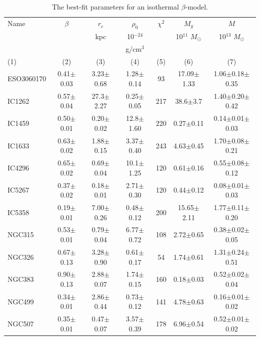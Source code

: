 \documentclass[iop]{emulateapj}
\begin{document}
\setcounter{table}{2}
\begin{table}
\centering
\caption{The best-fit parameters for an isothermal $\beta$-model.}\label{tab3}
\begin{tabular}{lcccccc}
\hline
Name   & $\beta$       & $r_c$         & $\rho_0$   & $\chi^2$ &  $M_{g}$              & $M$                   \\
       &               & kpc           & 10$^{-24}$ &          &  10$^{11}$ $M_{\odot}$ & 10$^{13}$ $M_{\odot}$ \\
       &               &               & g/cm$^3$   &          &                       &                       \\
  (1)  &         (2)   &  (3)          &  (4)       & (5)      &   (6)                 & (7)                   \\ 
\hline
ESO3060170 & 0.41$\pm$0.03 & 3.23$\pm$0.68 & 1.28$\pm$0.14  & 93  & 17.09$\pm$1.33 & 1.06$\pm$0.18$\pm$0.35 \\
IC1262  & 0.57$\pm$0.04 & 27.3$\pm$2.27 & 0.25$\pm$0.05 & 217 & 38.6$\pm$3.7 & 1.40$\pm$0.20$\pm$0.42 \\
IC1459  & 0.50$\pm$0.01 & 0.20$\pm$0.02 & 12.8$\pm$1.60 & 220 & 0.27$\pm$0.11 & 0.14$\pm$0.01$\pm$0.03    \\
IC1633  & 0.63$\pm$0.02 & 1.88$\pm$0.15 & 3.37$\pm$0.40 & 243 & 4.63$\pm$0.45 & 1.70$\pm$0.08$\pm$0.21   \\
IC4296  & 0.65$\pm$0.02 & 0.69$\pm$0.04 & 10.1$\pm$1.25 & 120 & 0.61$\pm$0.16 & 0.55$\pm$0.08$\pm$0.12     \\
IC5267  & 0.37$\pm$0.02 & 0.18$\pm$0.01 & 2.71$\pm$0.30 & 120 & 0.44$\pm$0.12 & 0.08$\pm$0.01$\pm$0.03   \\
IC5358  & 0.19$\pm$0.01 & 7.00$\pm$0.26 & 0.48$\pm$0.12 & 200 & 15.65$\pm$2.11 & 1.77$\pm$0.11$\pm$0.20  \\
NGC315  & 0.53$\pm$0.01 & 0.79$\pm$0.04 & 6.77$\pm$0.72 & 108 & 2.72$\pm$0.65 & 0.38$\pm$0.02$\pm$0.05   \\
NGC326  & 0.67$\pm$0.13 & 3.28$\pm$0.90 & 0.61$\pm$0.17 & 54 & 1.74$\pm$0.61 & 1.31$\pm$0.24$\pm$0.51   \\
NGC383  & 0.90$\pm$0.13 & 2.88$\pm$0.07 & 1.74$\pm$0.15  & 160  & 0.18$\pm$0.03 & 0.52$\pm$0.02$\pm$0.04   \\
NGC499  & 0.34$\pm$0.01 & 2.86$\pm$0.44 & 0.73$\pm$0.12 & 141 & 4.78$\pm$0.63 & 0.16$\pm$0.01$\pm$0.02   \\
NGC507  & 0.35$\pm$0.01 & 0.47$\pm$0.07 & 3.57$\pm$0.39 & 178 & 6.96$\pm$0.54 & 0.52$\pm$0.01$\pm$0.02   \\

\end{tabular}
\end{table}
\end{document}
